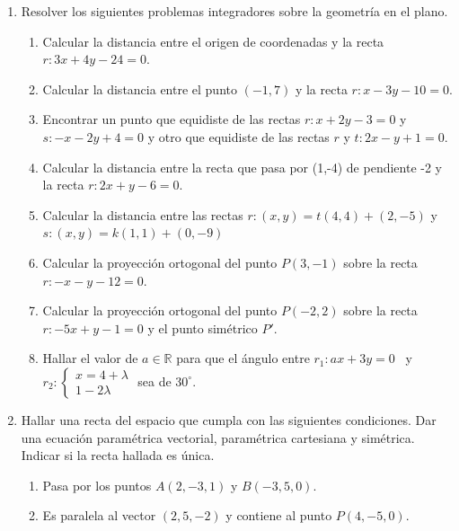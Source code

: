 \documentclass[a4paper]{article}
\newcommand{\exercise}{\item}
\begin{document}
\begin{enumerate}
\begin{multicols}{2}
\begin{enumerate} [label=(\alph*)]
		\item $\left\{\begin{matrix}-x+y-5=0 \\ 2x+y-17=0 \\ x+2y-17=0 \\ 3x+3y-34=0 \end{matrix}\right.$
	\end{enumerate}
	\end{multicols}
	\exercise Resolver los siguientes problemas integradores sobre la geometría en el plano.
	\begin{enumerate} [label=(\alph*)]
		\item Calcular la distancia entre el origen de coordenadas y la recta $r: 3x+4y -24=0$.
		\item Calcular la distancia entre el punto $(-1,7)$ y la recta $r: x-3y -10=0$.
		\item Encontrar un punto que equidiste de las rectas $r: x+2y-3=0$ y $s: -x-2y+4=0$ y otro que equidiste de las rectas $r$ y $t: 2x-y+1=0$.
		\item Calcular la distancia entre la recta que pasa por (1,-4) de pendiente -2 y la recta $r: 2x+y-6=0$.
		\item Calcular la distancia entre las rectas $r: (x,y)=t(4,4)+(2,-5)$ y $s: (x,y)=k(1,1)+(0,-9)$
		\item Calcular la proyección ortogonal del punto $P(3,-1)$ sobre la recta $r: -x-y-12=0$.
		\item Calcular la proyección ortogonal del punto $P(-2,2)$ sobre la recta $r: -5x+y-1=0$ y el punto simétrico $P'$.
		\item Hallar el valor de $a\in\mathbb{R}$ para que el ángulo entre $r_1: ax+3y=0$ ~y~ $r_2:\left\{\begin{matrix} x=4+\lambda \\ 1-2\lambda \end{matrix}\right.$ sea de $30^{\circ}$. 
	\end{enumerate}
	\exercise Hallar una recta del espacio que cumpla con las siguientes condiciones. Dar una ecuación paramétrica vectorial, paramétrica cartesiana y simétrica. Indicar si la recta hallada es única.
	\begin{enumerate} [label=(\alph*)]
		\item Pasa por los puntos $A(2,-3,1)$ y $B(-3,5,0)$.
		\item Es paralela al vector $(2,5,-2)$ y contiene al punto $P(4,-5,0)$.

\end{enumerate}
\end{enumerate}
\end{document}
